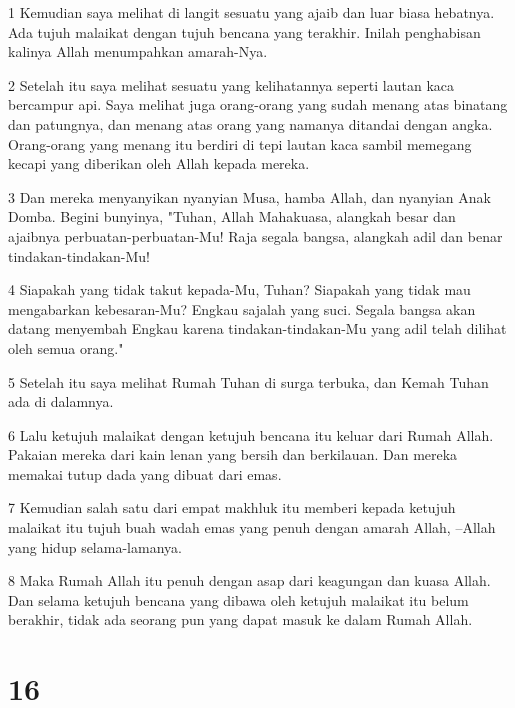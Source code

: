 \par 1 Kemudian saya melihat di langit sesuatu yang ajaib dan luar biasa hebatnya. Ada tujuh malaikat dengan tujuh bencana yang terakhir. Inilah penghabisan kalinya Allah menumpahkan amarah-Nya.
\par 2 Setelah itu saya melihat sesuatu yang kelihatannya seperti lautan kaca bercampur api. Saya melihat juga orang-orang yang sudah menang atas binatang dan patungnya, dan menang atas orang yang namanya ditandai dengan angka. Orang-orang yang menang itu berdiri di tepi lautan kaca sambil memegang kecapi yang diberikan oleh Allah kepada mereka.
\par 3 Dan mereka menyanyikan nyanyian Musa, hamba Allah, dan nyanyian Anak Domba. Begini bunyinya, "Tuhan, Allah Mahakuasa, alangkah besar dan ajaibnya perbuatan-perbuatan-Mu! Raja segala bangsa, alangkah adil dan benar tindakan-tindakan-Mu!
\par 4 Siapakah yang tidak takut kepada-Mu, Tuhan? Siapakah yang tidak mau mengabarkan kebesaran-Mu? Engkau sajalah yang suci. Segala bangsa akan datang menyembah Engkau karena tindakan-tindakan-Mu yang adil telah dilihat oleh semua orang."
\par 5 Setelah itu saya melihat Rumah Tuhan di surga terbuka, dan Kemah Tuhan ada di dalamnya.
\par 6 Lalu ketujuh malaikat dengan ketujuh bencana itu keluar dari Rumah Allah. Pakaian mereka dari kain lenan yang bersih dan berkilauan. Dan mereka memakai tutup dada yang dibuat dari emas.
\par 7 Kemudian salah satu dari empat makhluk itu memberi kepada ketujuh malaikat itu tujuh buah wadah emas yang penuh dengan amarah Allah, --Allah yang hidup selama-lamanya.
\par 8 Maka Rumah Allah itu penuh dengan asap dari keagungan dan kuasa Allah. Dan selama ketujuh bencana yang dibawa oleh ketujuh malaikat itu belum berakhir, tidak ada seorang pun yang dapat masuk ke dalam Rumah Allah.

\chapter{16}

